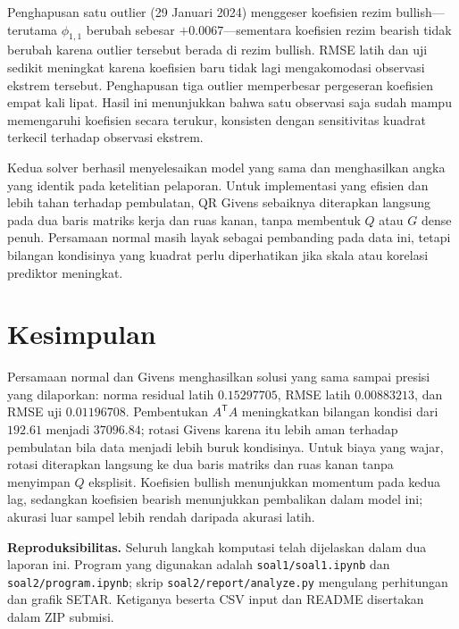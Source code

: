 \documentclass[12pt,a4paper]{article}
\numberwithin{equation}{section}
\begin{document}
Penghapusan satu outlier (29 Januari 2024) menggeser koefisien rezim bullish---terutama $\phi_{1,1}$ berubah sebesar $+0.0067$---sementara koefisien rezim bearish tidak berubah karena outlier tersebut berada di rezim bullish. RMSE latih dan uji sedikit meningkat karena koefisien baru tidak lagi mengakomodasi observasi ekstrem tersebut. Penghapusan tiga outlier memperbesar pergeseran koefisien empat kali lipat. Hasil ini menunjukkan bahwa satu observasi saja sudah mampu memengaruhi koefisien secara terukur, konsisten dengan sensitivitas kuadrat terkecil terhadap observasi ekstrem.

Kedua solver berhasil menyelesaikan model yang sama dan menghasilkan angka yang identik pada ketelitian pelaporan. Untuk implementasi yang efisien dan lebih tahan terhadap pembulatan, QR Givens sebaiknya diterapkan langsung pada dua baris matriks kerja dan ruas kanan, tanpa membentuk $Q$ atau $G$ dense penuh. Persamaan normal masih layak sebagai pembanding pada data ini, tetapi bilangan kondisinya yang kuadrat perlu diperhatikan jika skala atau korelasi prediktor meningkat.


\section{Kesimpulan}
Persamaan normal dan Givens menghasilkan solusi yang sama sampai presisi yang dilaporkan: norma residual latih $0.15297705$, RMSE latih $0.00883213$, dan RMSE uji $0.01196708$. Pembentukan $A^\mathsf{T}A$ meningkatkan bilangan kondisi dari $192.61$ menjadi $37096.84$; rotasi Givens karena itu lebih aman terhadap pembulatan bila data menjadi lebih buruk kondisinya. Untuk biaya yang wajar, rotasi diterapkan langsung ke dua baris matriks dan ruas kanan tanpa menyimpan $Q$ eksplisit. Koefisien bullish menunjukkan momentum pada kedua lag, sedangkan koefisien bearish menunjukkan pembalikan dalam model ini; akurasi luar sampel lebih rendah daripada akurasi latih.


\noindent\textbf{Reproduksibilitas.} Seluruh langkah komputasi telah dijelaskan dalam dua laporan ini. Program yang digunakan adalah \texttt{soal1/soal1.ipynb} dan \texttt{soal2/program.ipynb}; skrip \texttt{soal2/report/analyze.py} mengulang perhitungan dan grafik SETAR. Ketiganya beserta CSV input dan README disertakan dalam ZIP submisi.
\end{document}
